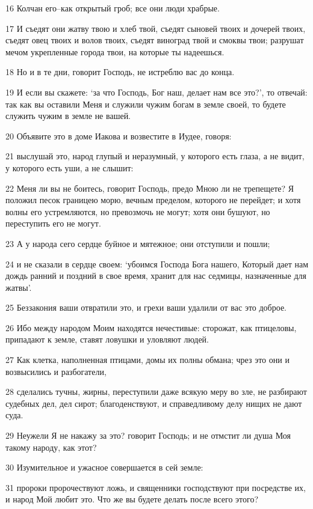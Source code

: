 \par 16 Колчан его--как открытый гроб; все они люди храбрые.
\par 17 И съедят они жатву твою и хлеб твой, съедят сыновей твоих и дочерей твоих, съедят овец твоих и волов твоих, съедят виноград твой и смоквы твои; разрушат мечом укрепленные города твои, на которые ты надеешься.
\par 18 Но и в те дни, говорит Господь, не истреблю вас до конца.
\par 19 И если вы скажете: `за что Господь, Бог наш, делает нам все это?', то отвечай: так как вы оставили Меня и служили чужим богам в земле своей, то будете служить чужим в земле не вашей.
\par 20 Объявите это в доме Иакова и возвестите в Иудее, говоря:
\par 21 выслушай это, народ глупый и неразумный, у которого есть глаза, а не видит, у которого есть уши, а не слышит:
\par 22 Меня ли вы не боитесь, говорит Господь, предо Мною ли не трепещете? Я положил песок границею морю, вечным пределом, которого не перейдет; и хотя волны его устремляются, но превозмочь не могут; хотя они бушуют, но переступить его не могут.
\par 23 А у народа сего сердце буйное и мятежное; они отступили и пошли;
\par 24 и не сказали в сердце своем: `убоимся Господа Бога нашего, Который дает нам дождь ранний и поздний в свое время, хранит для нас седмицы, назначенные для жатвы'.
\par 25 Беззакония ваши отвратили это, и грехи ваши удалили от вас это доброе.
\par 26 Ибо между народом Моим находятся нечестивые: сторожат, как птицеловы, припадают к земле, ставят ловушки и уловляют людей.
\par 27 Как клетка, наполненная птицами, домы их полны обмана; чрез это они и возвысились и разбогатели,
\par 28 сделались тучны, жирны, переступили даже всякую меру во зле, не разбирают судебных дел, дел сирот; благоденствуют, и справедливому делу нищих не дают суда.
\par 29 Неужели Я не накажу за это? говорит Господь; и не отмстит ли душа Моя такому народу, как этот?
\par 30 Изумительное и ужасное совершается в сей земле:
\par 31 пророки пророчествуют ложь, и священники господствуют при посредстве их, и народ Мой любит это. Что же вы будете делать после всего этого?

